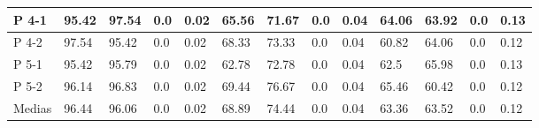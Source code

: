 \begin{table}[]
{\begin{tabular}{l|l|l|l|l|l|l|l|l|l|l|l|l|}
\multicolumn{1}{|l|}{P 4-1}  & 95.42    & 97.54   & 0.0    & 0.02   & 65.56    & 71.67   & 0.0    & 0.04   & 64.06    & 63.92   & 0.0    & 0.13   \\ \hline
\multicolumn{1}{|l|}{P 4-2}  & 97.54    & 95.42   & 0.0    & 0.02   & 68.33    & 73.33   & 0.0    & 0.04   & 60.82    & 64.06   & 0.0    & 0.12   \\ \hline
\multicolumn{1}{|l|}{P 5-1}  & 95.42    & 95.79   & 0.0    & 0.02   & 62.78    & 72.78   & 0.0    & 0.04   & 62.5     & 65.98   & 0.0    & 0.13   \\ \hline
\multicolumn{1}{|l|}{P 5-2}  & 96.14    & 96.83   & 0.0    & 0.02   & 69.44    & 76.67   & 0.0    & 0.04   & 65.46    & 60.42   & 0.0    & 0.12   \\ \hline
\multicolumn{1}{|l|}{Medias} & 96.44   &  96.06   & 0.0    & 0.02   &   68.89  &  74.44  & 0.0    & 0.04   &   63.36  &  63.52  & 0.0    & 0.12    \\ \hline
\end{tabular}}
\end{table}

